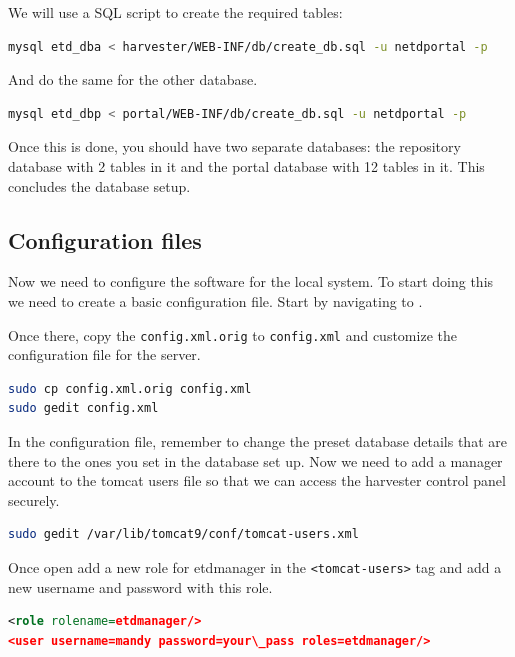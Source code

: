 \documentclass[a4paper,11pt]{article}
\begin{document}
We will use a SQL script to create the required tables: 

\begin{lstlisting}[language=bash]
mysql etd_dba < harvester/WEB-INF/db/create_db.sql -u netdportal -p
\end{lstlisting}

And do the same for the other database. 

\begin{lstlisting}[language=bash]
mysql etd_dbp < portal/WEB-INF/db/create_db.sql -u netdportal -p
\end{lstlisting}

Once this is done, you should have two separate databases: the repository database with 2 tables in it and the portal database with 12 tables in it. This concludes the database setup.

\subsection{Configuration files}
\label{sec:installation_process:configuration_files}

Now we need to configure the software for the local system. To start doing this we need to create a basic configuration file. Start by navigating to .

Once there, copy the \texttt{config.xml.orig} to \texttt{config.xml} and customize the configuration file for the server. 

\begin{lstlisting}[language=bash]
sudo cp config.xml.orig config.xml 
sudo gedit config.xml
\end{lstlisting}

In the configuration file, remember to change the preset database details that are there to the ones you set in the database set up. Now we need to add a manager account to the tomcat users file so that we can access the harvester control panel securely. 

\begin{lstlisting}[language=bash]
sudo gedit /var/lib/tomcat9/conf/tomcat-users.xml
\end{lstlisting}

Once open add a new role for etdmanager in the \texttt{<tomcat-users>} tag and add a new username and password with this role. 

\begin{lstlisting}[language=XML]
<role rolename=etdmanager/> 
<user username=mandy password=your\_pass roles=etdmanager/>
\end{lstlisting}
\end{document}
